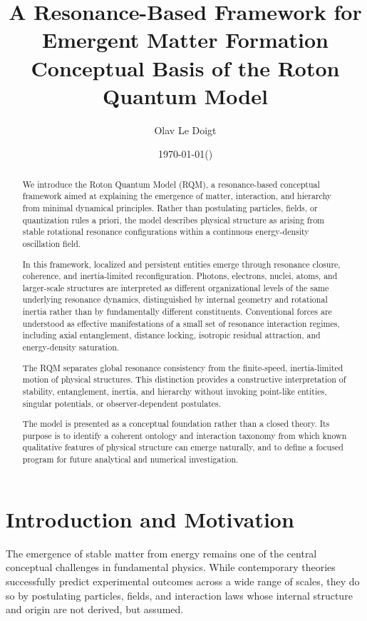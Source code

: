 \documentclass[11pt,a4paper]{article}
\title{A Resonance-Based Framework for Emergent Matter Formation\\
Conceptual Basis of the Roton Quantum Model}
\author{Olav Le Doigt}
\date{\today\;\;(\paperversion)}
\begin{document}
\maketitle

\begin{abstract}
We introduce the Roton Quantum Model (RQM), a resonance-based conceptual framework aimed at
explaining the emergence of matter, interaction, and hierarchy from minimal dynamical
principles. Rather than postulating particles, fields, or quantization rules a priori,
the model describes physical structure as arising from stable rotational resonance
configurations within a continuous energy-density oscillation field.

In this framework, localized and persistent entities emerge through resonance closure,
coherence, and inertia-limited reconfiguration. Photons, electrons, nuclei, atoms, and
larger-scale structures are interpreted as different organizational levels of the same
underlying resonance dynamics, distinguished by internal geometry and rotational inertia
rather than by fundamentally different constituents. Conventional forces are understood
as effective manifestations of a small set of resonance interaction regimes, including
axial entanglement, distance locking, isotropic residual attraction, and energy-density
saturation.

The RQM separates global resonance consistency from the finite-speed, inertia-limited motion of physical
structures. This distinction provides a constructive interpretation of stability,
entanglement, inertia, and hierarchy without invoking point-like entities, singular
potentials, or observer-dependent postulates.

The model is presented as a conceptual foundation rather than a closed theory. Its purpose
is to identify a coherent ontology and interaction taxonomy from which known qualitative
features of physical structure can emerge naturally, and to define a focused program for
future analytical and numerical investigation.
\end{abstract}


\section{Introduction and Motivation}

The emergence of stable matter from energy remains one of the central conceptual challenges
in fundamental physics. While contemporary theories successfully predict experimental
outcomes across a wide range of scales, they do so by postulating particles, fields, and
interaction laws whose internal structure and origin are not derived, but assumed.
\end{document}

